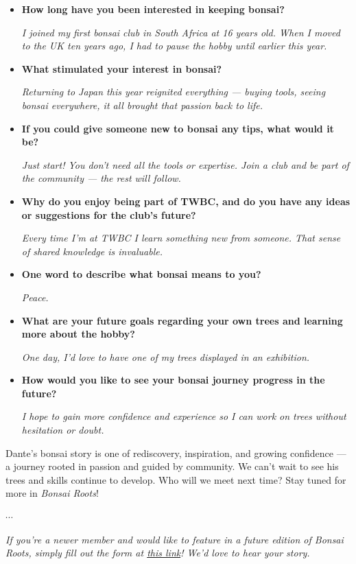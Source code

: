 \begin{itemize}
    \item \textbf{How long have you been interested in keeping bonsai?}

    \emph{I joined my first bonsai club in South Africa at 16 years old. When I moved to the UK ten years ago, I had to pause the hobby until earlier this year.}

    \item \textbf{What stimulated your interest in bonsai?}

    \emph{Returning to Japan this year reignited everything --- buying tools, seeing bonsai everywhere, it all brought that passion back to life.}

    \item \textbf{If you could give someone new to bonsai any tips, what would it be?}

    \emph{Just start! You don't need all the tools or expertise. Join a club and be part of the community --- the rest will follow.}

    \item \textbf{Why do you enjoy being part of TWBC, and do you have any ideas or suggestions for the club's future?}

    \emph{Every time I'm at TWBC I learn something new from someone. That sense of shared knowledge is invaluable.}

    \item \textbf{One word to describe what bonsai means to you?}

    \emph{Peace.}

    \item \textbf{What are your future goals regarding your own trees and learning more about the hobby?}

    \emph{One day, I'd love to have one of my trees displayed in an exhibition.}

    \item \textbf{How would you like to see your bonsai journey progress in the future?}

    \emph{I hope to gain more confidence and experience so I can work on trees without hesitation or doubt.}
\end{itemize}

Dante's bonsai story is one of rediscovery, inspiration, and growing confidence --- a journey rooted in passion and guided by community. We can't wait to see his trees and skills continue to develop. Who will we meet next time? Stay tuned for more in \emph{Bonsai Roots}!

\begin{center}
$\cdots$
\end{center}

\noindent
\emph{If you're a newer member and would like to feature in a future edition of Bonsai Roots, simply fill out the form at \href{https://forms.gle/quVXa4L8rhpnT5kr6}{this link}! We'd love to hear your story.}

\closearticle
\columnbreak